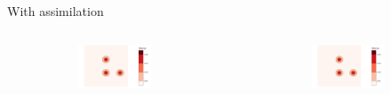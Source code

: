 \documentclass[aspectratio=169]{beamer} %
\begin{document}
\begin{frame}{With assimilation}
    \begin{columns}
        \begin{column}{0.5\textwidth}
            \begin{figure}
                \centering
                \begin{subfigure}{\textwidth}
                    \centering
                    \includegraphics[width=\textwidth]{images/vorticity_field.png}
                \end{subfigure}
                \begin{subfigure}{\textwidth}
                    \centering
                \end{subfigure}
            \end{figure}
        \end{column}
        \begin{column}{0.5\textwidth}
            \begin{figure}
                \centering
                \begin{subfigure}{\textwidth}
                    \centering
                    \includegraphics[width=\textwidth]{images/vorticity_field.png}

\end{subfigure}
\end{figure}
\end{column}
\end{columns}
\end{frame}
\end{document}
